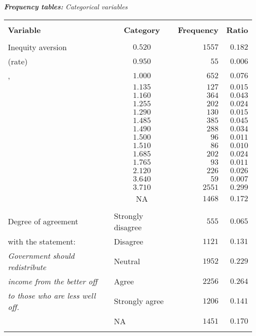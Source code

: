 \documentclass[a4paper,12pt]{article}
\begin{document}
{\centering
\begin{threeparttable}
\caption{\vspace{-0.27cm} \small{\textit{\textbf{Frequency tables:} Categorical variables}}}
\label{FreqiencyCat2} 
\centering
\begin{small}
\begin{tabular}{l|crr} 
\hline \vspace{-0.27cm} \\	
  \multicolumn{1}{l|}{\textbf{Variable}}& \multicolumn{1}{c}{\textbf{Category}} &  \multicolumn{1}{c}{\textbf{Frequency}}  &  \multicolumn{1}{c}{\textbf{Ratio}}   \\ 
\hline \vspace{-0.27cm}\\
  Inequity aversion&$0.520$&$1557$&$0.182$\\
 \hspace{0.15cm}(rate) &$0.950$&$55$&$0.006$\\
 \hspace{0.15cm}\citet{bergson1954, bergson1938}, &$1.000$&$652$&$0.076$\\
 \hspace{0.15cm}\citet{samuelson1956} &$1.135$&$127$&$0.015$\\
   &$1.160$&$364$&$0.043$\\
    &$1.255$&$202$&$0.024$\\
    &$1.290$&$130$&$0.015$\\ 
    &$1.485$&$385$&$0.045$\\
    &$1.490$&$288$&$0.034$\\
    &$1.500$&$96$&$0.011$\\ 
     &$1.510$&$86$&$0.010$\\ 
    &$1.685$&$202$&$0.024$\\
    &$1.765$&$93$&$0.011$\\
    &$2.120$&$226$&$0.026$\\ 
    &$3.640$&$59$&$0.007$\\
    &$3.710$&$2551$&$0.299$\\
    &NA&$1468$&$0.172$\\ 
 \hline  \vspace{-0.27cm}\\
 Degree of agreement&\multicolumn{1}{l}{Strongly disagree}&$555$&$0.065$\\ 
 \hspace{0.15cm}with the statement:&\multicolumn{1}{l}{Disagree}&$1121$&$0.131$\\ 
  \textit{ Government should redistribute}&\multicolumn{1}{l}{Neutral}&$1952$&$0.229$\\ 
  \textit{ income from the better off}&\multicolumn{1}{l}{Agree}&$2256$&$0.264$\\ 
  \textit{ to those who are less well off.}&\multicolumn{1}{l}{Strongly agree}&$1206$&$0.141$\\ 
&\multicolumn{1}{l}{NA}&$1451$&$0.170$\\ 
  \hline  \vspace{-0.27cm}\\
  

\end{tabular}
\end{small}
\end{threeparttable}}
\end{document}
